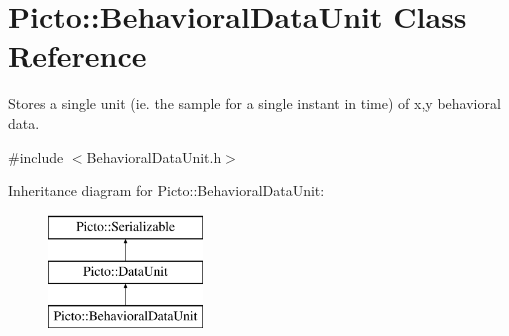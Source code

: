 \hypertarget{class_picto_1_1_behavioral_data_unit}{\section{Picto\-:\-:Behavioral\-Data\-Unit Class Reference}
\label{class_picto_1_1_behavioral_data_unit}
}


Stores a single unit (ie. the sample for a single instant in time) of x,y behavioral data.  




{\ttfamily \#include $<$Behavioral\-Data\-Unit.\-h$>$}

Inheritance diagram for Picto\-:\-:Behavioral\-Data\-Unit\-:\begin{figure}[H]
\begin{center}
\leavevmode
\includegraphics[height=3.000000cm]{class_picto_1_1_behavioral_data_unit}
\end{center}
\end{figure}
